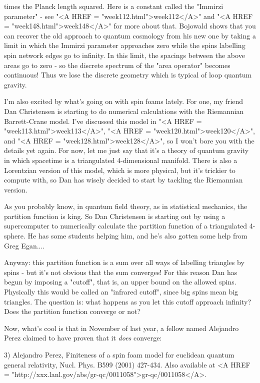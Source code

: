 times the Planck length squared.  Here \gamma  is a constant called the
"Immirzi parameter" - see "<A HREF =
"week112.html">week112</A>" and "<A HREF =
"week148.html">week148</A>" for more about that.  Bojowald shows
that you can recover the old approach to quantum cosmology from his new
one by taking a limit in which the Immirzi parameter approaches zero
while the spins labelling spin network edges go to infinity.  In this
limit, the spacings between the above areas go to zero - so the discrete
spectrum of the "area operator" becomes continuous!  Thus we
lose the discrete geometry which is typical of loop quantum gravity.

I'm also excited by what's going on with spin foams lately.  For one, my
friend Dan Christensen is starting to do numerical calculations with the
Riemannian Barrett-Crane model.  I've discussed this model in "<A
HREF = "week113.html">week113</A>", "<A HREF =
"week120.html">week120</A>", and "<A HREF =
"week128.html">week128</A>", so I won't bore you with the details
yet again.  For now, let me just say that it's a theory of quantum
gravity in which spacetime is a triangulated 4-dimensional manifold.
There is also a Lorentzian version of this model, which is more
physical, but it's trickier to compute with, so Dan has wisely decided to
start by tackling the Riemannian version.

As you probably know, in quantum field theory, as in statistical
mechanics, the partition function is king.  So Dan Christensen is
starting out by using a supercomputer to numerically calculate the
partition function of a triangulated 4-sphere.  He has some students
helping him, and he's also gotten some help from Greg Egan.... 

Anyway: this partition function is a sum over all ways of labelling
triangles by spins - but it's not obvious that the sum converges!  For
this reason Dan has begun by imposing a "cutoff", that is, an upper
bound on the allowed spins.  Physically this would be called an
"infrared cutoff", since big spins mean big triangles.  The question 
is: what happens as you let this cutoff approach infinity?  Does the 
partition function converge or not?

Now, what's cool is that in November of last year, a fellow named
Alejandro Perez claimed to have proven that it \emph{does} converge:

3) Alejandro Perez, Finiteness of a spin foam model for euclidean 
quantum general relativity, Nucl. Phys. B599 (2001) 427-434.  
Also available at <A HREF = "http://xxx.lanl.gov/abs/gr-qc/0011058">gr-qc/0011058</A>.

